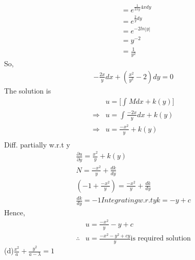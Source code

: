 \documentclass{report}
\begin{document}
{\begin{align*}
        & = e^{\frac{1}{2xy}4xdy}\\
        & = e^{\frac{2}{y}dy}\\
        & = e^{-2ln|y|}\\
        & = y^{-2}\\
        & = \frac{1}{y^{2}}
    \end{align*}
    So,
    \begin{align*}
        -\frac{2x}{y}dx + (\frac{x^2}{y^2}-2 )dy = 0
    \end{align*}
    The solution is
    \begin{align*}
        & u = \big[
            \int_{}^{}Mdx+k(y)
        \big]\\
        \Rightarrow & u = \int_{}^{}\frac{-2x}{y}dx+k(y)\\
        \Rightarrow & u = \frac{-x^2}{y}+k(y)\\
    \end{align*}
    Diff. partially w.r.t y 
    \begin{align*}
        \frac{\partial u}{\partial y} = \frac{x^2}{y}+k(y)\\
        N = \frac{-x^2}{y}+\frac{dk}{dy}\\
        (-1+\frac{-x^2}{y}) = \frac{-x^2}{y}+\frac{dk}{dy}\\
        \frac{dk}{dy}=-1
        Integrating w.r.t y
        k = -y+c
    \end{align*}
    Hence,
    \begin{align*}
        & u = \frac{-x^2}{y}-y+c\\
        \therefore & u = \frac{-x^2-y^2+cy}{y} \text{is required solution}
    \end{align*}
}
(d)$\frac{x^2}{a}+\frac{y^2}{a-\lambda}=1$\\
\end{document}
